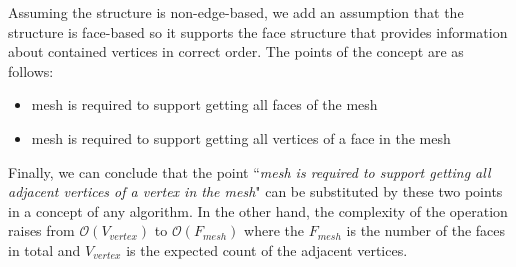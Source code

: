 Assuming the structure is non-edge-based, we add an assumption that the structure is face-based
so it supports the face structure that provides information about contained vertices in correct
order. The points of the concept are as follows:

\begin{itemize}
\item mesh is required to support getting all faces of the mesh
\item mesh is required to support getting all vertices of a face in the mesh
\end{itemize}
Finally, we can conclude that the point ``\emph{mesh is required to support getting all adjacent vertices
of a vertex in the mesh}" can be substituted by these two points in a concept of any 
algorithm. In the other hand, the complexity of the operation raises from 
$\mathcal{O}(V_{vertex})$ to $\mathcal{O}(F_{mesh})$ where the $F_{mesh}$ is the number of the
faces in total and $V_{vertex}$ is the expected count of the adjacent vertices.